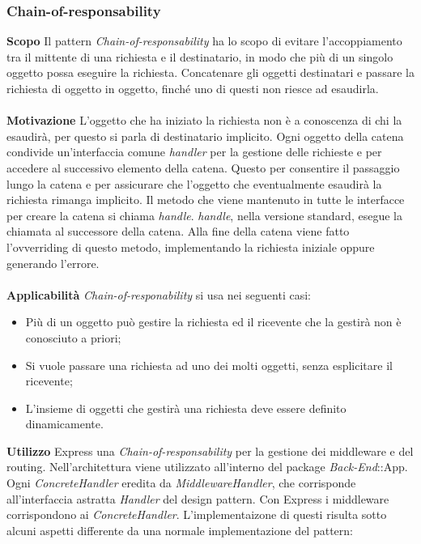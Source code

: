 \subsubsection{Chain-of-responsability}
\textbf{Scopo}	Il pattern \textit{Chain-of-responsability} ha lo scopo di evitare l'accoppiamento tra il mittente di una richiesta e il destinatario, in modo che più di un singolo oggetto possa eseguire la richiesta. Concatenare gli oggetti destinatari e passare la richiesta di oggetto in oggetto, finché uno di questi non riesce ad esaudirla.
\\\\
\textbf{Motivazione}	L'oggetto che ha iniziato la richiesta non è a conoscenza di chi la esaudirà, per questo si parla di destinatario implicito. Ogni oggetto della catena condivide un'interfaccia comune \textit{handler} per la gestione delle richieste e per accedere al successivo elemento della catena. Questo per consentire il passaggio lungo la catena e per assicurare che l'oggetto che eventualmente esaudirà la richiesta rimanga implicito. Il metodo che viene mantenuto in tutte le interfacce per creare la catena si chiama \textit{handle}. \textit{handle}, nella versione standard, esegue la chiamata al successore della catena. Alla fine della catena viene fatto l'ovverriding di questo metodo, implementando la richiesta iniziale oppure generando l'errore.
\\\\
\textbf{Applicabilità}	\textit{Chain-of-responability} si usa nei seguenti casi:
	\begin{itemize}
		\item Più di un oggetto può gestire la richiesta ed il ricevente che la gestirà non è conosciuto a priori;
		\item Si vuole passare una richiesta ad uno dei molti oggetti, senza esplicitare il ricevente;
		\item L'insieme di oggetti che gestirà una richiesta deve essere definito dinamicamente.
	\end{itemize}
\textbf{Utilizzo}	Express una \textit{Chain-of-responsability} per la gestione dei middleware e del routing. Nell'architettura viene utilizzato all'interno del package \textit{Back-End}::App. Ogni \textit{ConcreteHandler} eredita da \textit{MiddlewareHandler}, che corrisponde all'interfaccia astratta \textit{Handler} del design pattern. Con Express i middleware corrispondono ai \textit{ConcreteHandler}. L'implementaizone di questi risulta sotto alcuni aspetti differente da una normale implementazione del pattern:
